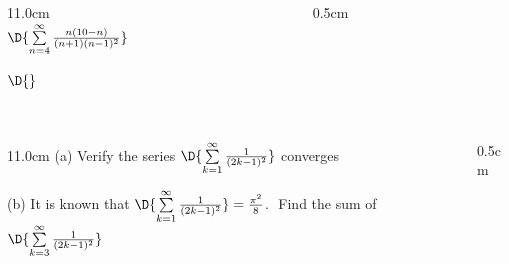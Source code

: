 \begin{frame}
\frametitle{}
\scriptsize

\vspace{0.2cm}

\begin{columns}
\begin{column}{11.0cm}
\\

$\D{\sum \limits_{n=4}^{\infty} \frac{n(10-n)}{(n + 1)(n-1)^2}}$

\vspace{4.0cm}

$\D{}$

\vspace{6.5cm}

\end{column}
\begin{column}{0.5cm}
	
\end{column}
\end{columns}
\end{frame}

\begin{frame}
\frametitle{}
\scriptsize

\vspace{0.2cm}

\begin{columns}
\begin{column}{11.0cm}
(a) Verify the series \quad $\D{\sum \limits_{k=1}^{\infty} \frac{1}{(2k-1)^2}}$ \quad converges\\

\vspace{4.0cm}

(b) It is known that $\D{\sum \limits_{k=1}^{\infty} \frac{1}{(2k-1)^2}} = \frac{\pi^2}{8}$.  \,\,Find the sum of \quad $\D{\sum \limits_{k=3}^{\infty} \frac{1}{(2k-1)^2}}$

\vspace{6.5cm}

\end{column}
\begin{column}{0.5cm}
	
\end{column}
\end{columns}
\end{frame}
